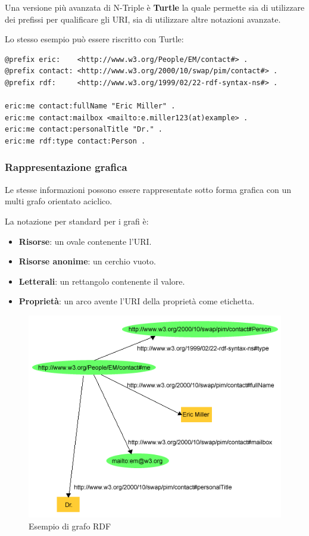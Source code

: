 Una versione più avanzata di N-Triple è \textbf{Turtle} la quale permette sia di utilizzare dei prefissi per qualificare gli URI, sia di utilizzare altre notazioni avanzate.

Lo stesso esempio può essere riscritto con Turtle:

\begin{lstlisting}
@prefix eric:    <http://www.w3.org/People/EM/contact#> .
@prefix contact: <http://www.w3.org/2000/10/swap/pim/contact#> .
@prefix rdf:     <http://www.w3.org/1999/02/22-rdf-syntax-ns#> .

eric:me contact:fullName "Eric Miller" .
eric:me contact:mailbox <mailto:e.miller123(at)example> .
eric:me contact:personalTitle "Dr." .
eric:me rdf:type contact:Person .
\end{lstlisting}

\subsubsection{Rappresentazione grafica}

Le stesse informazioni possono essere rappresentate sotto forma grafica con un multi grafo orientato aciclico.

La notazione per standard per i grafi è:

\begin{itemize}
	\item \textbf{Risorse}: un ovale contenente l'URI.
	\item \textbf{Risorse anonime}: un cerchio vuoto.
	\item \textbf{Letterali}: un rettangolo contenente il valore.
	\item \textbf{Proprietà}: un arco avente l'URI della proprietà come etichetta.
\end{itemize}

\begin{figure}[htbp]
	\centering
	\includegraphics[width=.7\textwidth]{./images/miller_graph.png}
	\caption{Esempio di grafo RDF}
\end{figure}

